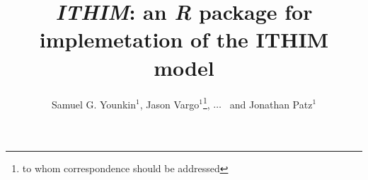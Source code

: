\documentclass{bioinfo}
\newcommand{\package}{\emph{ITHIM}}
\newcommand{\R}{\emph{R}}
\begin{document}

\title[\package{}]{\package{}: an \R{} package for implemetation of
  the ITHIM model}
\author[Younkin \textit{et~al}]{Samuel G. Younkin$^{1}$,
  Jason Vargo$^{1}$\footnote{to whom correspondence should be addressed},
  $\ldots$
  \ and Jonathan Patz$^{1}$}
\address{$^{1}$Global Health Institute\\
University of Wisconsin{\textendash}Madison, Madison, WI USA\\
}


\maketitle
\end{document}
